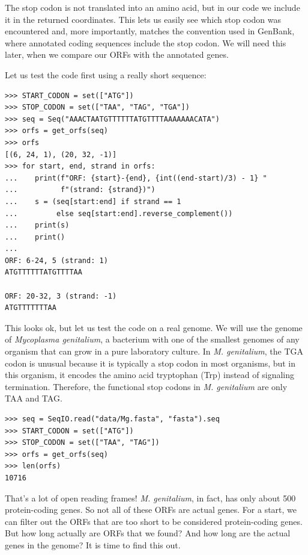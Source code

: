 The stop codon is not translated into an amino acid, but in our code we include it in the returned coordinates. This lets us easily see which stop codon was encountered and, more importantly, matches the convention used in GenBank, where annotated coding sequences include the stop codon. We will need this later, when we compare our ORFs with the annotated genes.

Let us test the code first using a really short sequence:

\vspace*{3mm}
\begin{lstlisting}
>>> START_CODON = set(["ATG"])
>>> STOP_CODON = set(["TAA", "TAG", "TGA"])
>>> seq = Seq("AAACTAATGTTTTTTATGTTTTAAAAAAACATA")
>>> orfs = get_orfs(seq)
>>> orfs
[(6, 24, 1), (20, 32, -1)]
>>> for start, end, strand in orfs:
...    print(f"ORF: {start}-{end}, {int((end-start)/3) - 1} "
...          f"(strand: {strand})")
...    s = (seq[start:end] if strand == 1
...         else seq[start:end].reverse_complement())
...    print(s)
...    print()
...
ORF: 6-24, 5 (strand: 1)
ATGTTTTTTATGTTTTAA

ORF: 20-32, 3 (strand: -1)
ATGTTTTTTTAA
\end{lstlisting}

This looks ok, but let us test the code on a real genome. We will use the genome of {\em Mycoplasma genitalium}, a bacterium with one of the smallest genomes of any organism that can grow in a pure laboratory culture. In {\em M. genitalium}, the TGA codon is unusual because it is typically a stop codon in most organisms, but in this organism, it encodes the amino acid tryptophan (Trp) instead of signaling termination. Therefore, the functional stop codons in {\em M. genitalium} are only TAA and TAG.

\vspace*{3mm}
\begin{lstlisting}
>>> seq = SeqIO.read("data/Mg.fasta", "fasta").seq
>>> START_CODON = set(["ATG"])
>>> STOP_CODON = set(["TAA", "TAG"])
>>> orfs = get_orfs(seq)
>>> len(orfs)
10716
\end{lstlisting}

That's a lot of open reading frames! {\em M. genitalium}, in fact, has only about 500 protein-coding genes. So not all of these ORFs are actual genes. For a start, we can filter out the ORFs that are too short to be considered protein-coding genes. But how long actually are ORFs that we found? And how long are the actual genes in the genome? It is time to find this out.

